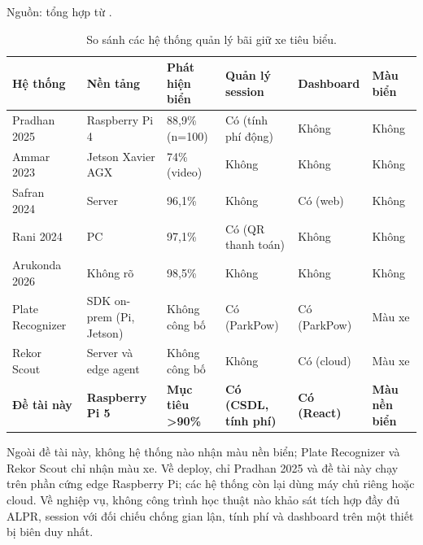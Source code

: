 \begin{table}[htbp]
\centering
\caption{So sánh các hệ thống quản lý bãi giữ xe tiêu biểu.}

\footnotesize Nguồn: tổng hợp từ \autocite{pradhan2025iotparking,ammar2023multistage,safran2024multistage,rani2024ips,arukonda2026smartparking,platerecognizer2026alpr,openalpr2016benchmarks}.
\label{tab:parking-compare}
\begin{tabular}{p{3.0cm} p{2.4cm} p{1.9cm} p{1.7cm} p{1.4cm} p{1.5cm}}
\hline
\textbf{Hệ thống} & \textbf{Nền tảng} & \textbf{Phát hiện biển} & \textbf{Quản lý session} & \textbf{Dashboard} & \textbf{Màu biển} \\
\hline
Pradhan 2025~\autocite{pradhan2025iotparking}
  & Raspberry Pi 4
  & 88,9\% (n=100)
  & Có (tính phí động)
  & Không
  & Không \\
Ammar 2023~\autocite{ammar2023multistage}
  & Jetson Xavier AGX
  & 74\% (video)
  & Không
  & Không
  & Không \\
Safran 2024~\autocite{safran2024multistage}
  & Server
  & 96,1\%
  & Không
  & Có (web)
  & Không \\
Rani 2024~\autocite{rani2024ips}
  & PC
  & 97,1\%
  & Có (QR thanh toán)
  & Không
  & Không \\
Arukonda 2026~\autocite{arukonda2026smartparking}
  & Không rõ
  & 98,5\%
  & Không
  & Không
  & Không \\
Plate Recognizer~\autocite{platerecognizer2026alpr}
  & SDK on-prem (Pi, Jetson)
  & Không công bố
  & Có (ParkPow)
  & Có (ParkPow)
  & Màu xe \\
Rekor Scout~\autocite{openalpr2016benchmarks}
  & Server và edge agent
  & Không công bố
  & Không
  & Có (cloud)
  & Màu xe \\
\textbf{Đề tài này}
  & \textbf{Raspberry Pi 5}
  & \textbf{Mục tiêu >90\%}
  & \textbf{Có (CSDL, tính phí)}
  & \textbf{Có (React)}
  & \textbf{Màu nền biển} \\
\hline
\end{tabular}
\end{table}

Ngoài đề tài này, không hệ thống nào nhận màu nền biển; Plate Recognizer và Rekor Scout chỉ
nhận màu xe. Về deploy, chỉ Pradhan 2025 và đề tài này chạy trên phần cứng edge
Raspberry Pi; các hệ thống còn lại dùng máy chủ riêng hoặc cloud. Về nghiệp vụ, không
công trình học thuật nào khảo sát tích hợp đầy đủ ALPR, session với đối chiếu chống gian
lận, tính phí và dashboard trên một thiết bị biên duy nhất.


